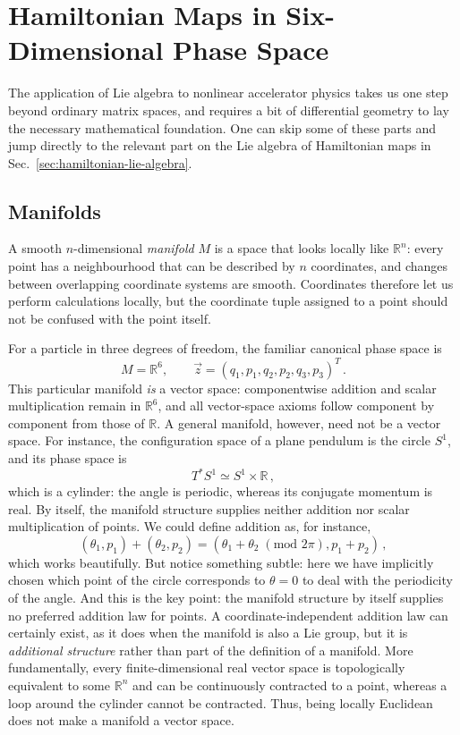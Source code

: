\section{Hamiltonian Maps in Six-Dimensional Phase Space}

The application of Lie algebra to nonlinear accelerator physics takes us
one step beyond ordinary matrix spaces, and requires a bit of differential
geometry to lay the necessary mathematical foundation. One can skip some of
these parts and jump directly to the relevant part on the Lie algebra of
Hamiltonian maps in Sec.~\ref{sec:hamiltonian-lie-algebra}.


\subsection{Manifolds}
A smooth $n$-dimensional \emph{manifold} $M$ is a space that looks locally
like $\mathbb{R}^n$: every point has a neighbourhood that can be described
by $n$ coordinates, and changes between overlapping coordinate systems are
smooth.  Coordinates therefore let us perform calculations locally, but the
coordinate tuple assigned to a point should not be confused with the point
itself.

For a particle in three degrees of freedom, the familiar canonical phase
space is
\begin{equation}
    M = \mathbb{R}^6,\qquad
    \vec z = (q_1,p_1,q_2,p_2,q_3,p_3)^T\,.
\end{equation}
This particular manifold \emph{is} a vector space: componentwise addition
and scalar multiplication remain in $\mathbb{R}^6$, and all vector-space
axioms follow component by component from those of $\mathbb{R}$.  A general
manifold, however, need not be a vector space.  For instance, the
configuration space of a plane pendulum is the circle $S^1$, and its phase
space is
\begin{equation}
    T^*S^1 \simeq S^1\times\mathbb{R}\,,
\end{equation}
which is a cylinder: the angle is periodic, whereas its conjugate momentum
is real.  By itself, the manifold structure supplies neither addition nor
scalar multiplication of points. We could define addition as, for instance,
\begin{equation}
    \left(\theta_1, p_1\right) + \left(\theta_2, p_2\right)
    = \left(\theta_1 + \theta_2 \;(\text{mod } 2\pi), p_1 + p_2\right)\,,
\end{equation}
which works beautifully. But notice something subtle: here we have implicitly
chosen which point of the circle corresponds to $\theta = 0$ to deal with the
periodicity of the angle. And this is the key point: the manifold structure by
itself supplies no preferred addition law for points.  A coordinate-independent
addition law can certainly exist, as it does when the manifold is also a Lie
group, but it is \emph{additional structure} rather than part of the definition
of a manifold. More fundamentally, every finite-dimensional real vector space
is topologically equivalent to some $\mathbb{R}^n$ and can be continuously
contracted to a point, whereas a loop around the cylinder cannot be contracted.
Thus, being locally Euclidean does not make a manifold a vector space.


